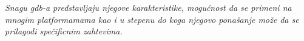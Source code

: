 \documentclass[a4paper]{article}
\begin{document}
{\em Snagu gdb-a predstavljaju njegove karakteristike, mogućnost da se primeni na mnogim platformamama kao i u 
stepenu do koga njegovo ponašanje može da se prilagodi spečificnim zahtevima.  \cite{gnu} }

\appendix
 

\end{document}
